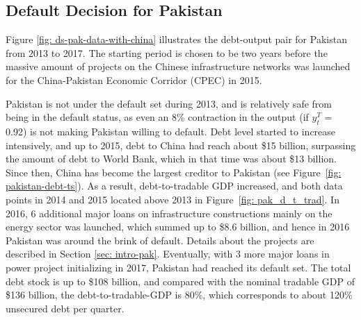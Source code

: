 \subsection{Default Decision for Pakistan}

Figure \ref{fig: ds-pak-data-with-china} illustrates the debt-output pair for Pakistan from 2013 to 2017. The starting period is chosen to be two years before the massive amount of projects on the Chinese infrastructure networks was launched for the China-Pakistan Economic Corridor (CPEC) in 2015.

Pakistan is not under the default set during 2013, and is relatively safe from being in the default status, as even an 8\% contraction in the output (if $y^T_t$ = 0.92) is not making Pakistan willing to default. Debt level started to increase intensively, and up to 2015, debt to China had reach about \$15 billion, surpassing the amount of debt to World Bank, which in that time was about \$13 billion. Since then, China has become the largest creditor to Pakistan (see Figure~\ref{fig: pakistan-debt-ts}). As a result, debt-to-tradable GDP increased, and both data points in 2014 and 2015 located above 2013 in Figure~\ref{fig: pak_d_t_trad}. In 2016, 6 additional major loans on infrastructure constructions mainly on the energy sector was launched, which summed up to \$8.6 billion, and hence in 2016 Pakistan was around the brink of default. Details about the projects are described in Section \ref{sec: intro-pak}.
Eventually, with 3 more major loans in power project initializing in 2017, Pakistan had reached its default set. The total debt stock is up to \$108 billion, and compared with the nominal tradable GDP of \$136 billion, the debt-to-tradable-GDP is 80\%, which corresponds to about 120\% unsecured debt per quarter.

